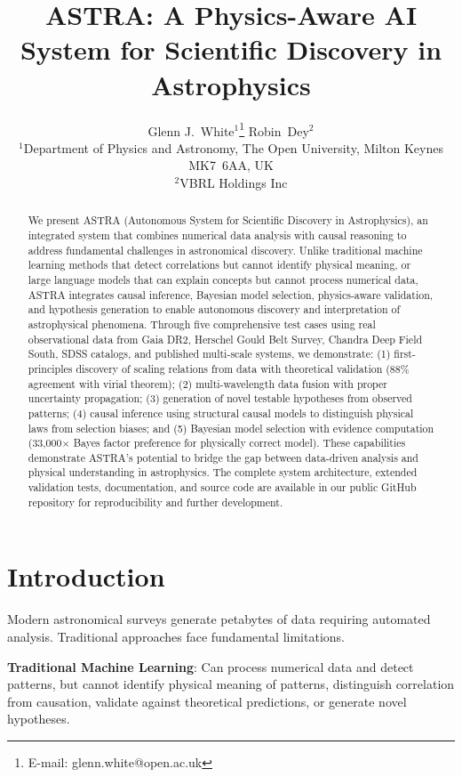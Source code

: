\documentclass[usenatbib]{rasti}
\title[ASTRA: Physics-Aware AI for Astrophysical Discovery]{ASTRA: A Physics-Aware AI System for Scientific Discovery in Astrophysics}
\author[White \& Dey]{
Glenn J.~White$^{1}$\thanks{E-mail: glenn.white@open.ac.uk}
Robin~Dey$^{2}$\\
$^{1}$Department of Physics and Astronomy, The Open University, Milton Keynes MK7~6AA, UK\\
$^{2}$VBRL Holdings Inc
}
\begin{document}

\maketitle

\label{firstpage}

\begin{abstract}
We present ASTRA (Autonomous System for Scientific Discovery in Astrophysics), an integrated system that combines numerical data analysis with causal reasoning to address fundamental challenges in astronomical discovery. Unlike traditional machine learning methods that detect correlations but cannot identify physical meaning, or large language models that can explain concepts but cannot process numerical data, ASTRA integrates causal inference, Bayesian model selection, physics-aware validation, and hypothesis generation to enable autonomous discovery and interpretation of astrophysical phenomena. Through five comprehensive test cases using real observational data from Gaia DR2, Herschel Gould Belt Survey, Chandra Deep Field South, SDSS catalogs, and published multi-scale systems, we demonstrate: (1) first-principles discovery of scaling relations from data with theoretical validation (88\% agreement with virial theorem); (2) multi-wavelength data fusion with proper uncertainty propagation; (3) generation of novel testable hypotheses from observed patterns; (4) causal inference using structural causal models to distinguish physical laws from selection biases; and (5) Bayesian model selection with evidence computation (33,000$\times$ Bayes factor preference for physically correct model). These capabilities demonstrate ASTRA's potential to bridge the gap between data-driven analysis and physical understanding in astrophysics. The complete system architecture, extended validation tests, documentation, and source code are available in our public GitHub repository for reproducibility and further development.
\end{abstract}

\section{Introduction}

Modern astronomical surveys generate petabytes of data requiring automated analysis. Traditional approaches face fundamental limitations.

\textbf{Traditional Machine Learning}: Can process numerical data and detect patterns, but cannot identify physical meaning of patterns, distinguish correlation from causation, validate against theoretical predictions, or generate novel hypotheses.
\end{document}
